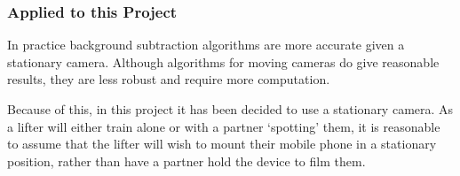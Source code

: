 \subsubsection{Applied to this Project}

In practice background subtraction algorithms are more accurate given a stationary camera. Although algorithms for moving cameras do give reasonable results, they are less robust and require more computation.

Because of this, in this project it has been decided to use a stationary camera. As a lifter will either train alone or with a partner `spotting' them, it is reasonable to assume that the lifter will wish to mount their mobile phone in a stationary position, rather than have a partner hold the device to film them.